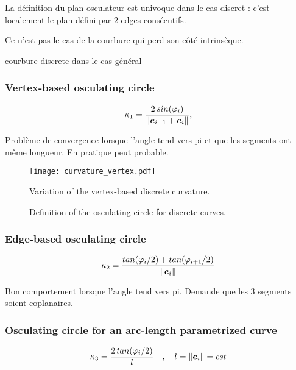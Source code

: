 La définition du plan osculateur est univoque dans le cas discret : c'est localement le plan défini par 2 edges consécutifs.

Ce n'est pas le cas de la courbure qui perd son côté intrinsèque.

courbure discrete dans le cas général

\subsubsection{Vertex-based osculating circle}

\begin{equation}
	\kappa_1 = \frac{2 \,sin(\varphi_i)}{\|\boldsymbol{e}_{i-1} + \boldsymbol{e}_{i} \|},
\end{equation}

Problème de convergence lorsque l'angle tend vers pi et que les segments ont même longueur.
En pratique peut probable.

\begin{figure}[]
\begin{center}
\texttt{[image: curvature\_vertex.pdf]}
\caption{Variation of the vertex-based discrete curvature.}
\label{fig:3_7}
\end{center}
\end{figure}

\begin{figure}[!tbp]
     \centering
     
     
     \caption{Definition of the osculating circle for discrete curves.}
     \label{steady_state}
\end{figure}

\subsubsection{Edge-based osculating circle}

\begin{equation}
	\kappa_2 = \frac{tan(\varphi_i/2) + tan(\varphi_{i+1}/2)}{\|\boldsymbol{e}_{i}\|}
\end{equation}

Bon comportement lorsque l'angle tend vers pi. Demande que les 3 segments soient coplanaires.

\subsubsection{Osculating circle for an arc-length parametrized curve}
\begin{equation}
	\kappa_3 = \frac{2 \,tan(\varphi_i/2)}{l}
	\quad , \quad 
	l = \|\boldsymbol{e}_{i} \| = cst
\end{equation}

